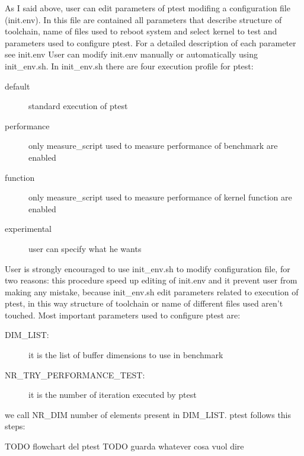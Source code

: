 \documentclass[a4paper,10pt]{article}
\begin{document}
\begin{multicols}{2}
As I said above, user can edit parameters of ptest modifing a configuration file (init.env).
In this file are contained all parameters that describe structure of toolchain, name of files
used to reboot system and select kernel to test and parameters used to configure ptest. 
For a detailed description of each parameter see init.env
User can modify init.env manually or automatically using init_env.sh.
In init_env.sh there are four execution profile for ptest:
\begin{description}
	\item[default] standard execution of ptest
	\item[performance] only measure\_script used to measure performance of benchmark are enabled 
	\item[function] only measure\_script used to measure performance of kernel function are enabled
	\item[experimental] user can specify what he wants
\end{description}

User is strongly encouraged to use init_env.sh to modify configuration file, for two reasons:
this procedure speed up editing of init.env and it prevent user from making any mistake, because init_env.sh
edit parameters related to execution of ptest, in this way structure of toolchain or name of different
files used aren't touched.
Most important parameters used to configure ptest are:

\begin{description}
	\item[DIM\_LIST:] it is the list of buffer dimensions to use in benchmark
	\item[NR\_TRY\_PERFORMANCE\_TEST:] it is the number of iteration executed by ptest
\end{description}

we call NR\_DIM number of elements present in DIM\_LIST.
ptest follows this steps:

TODO flowchart del ptest
TODO guarda whatever cosa vuol dire


\end{multicols}
\end{document}
